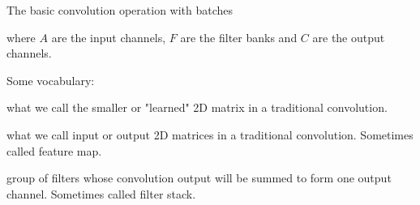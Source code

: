 \documentclass[utf8x,hyperref={pdfpagelabels=false}]{beamer}
\newcommand{\term}[1]{\textcolor{termblue}{#1}}
\begin{document}
\begin{frame}
The basic convolution operation with batches
\begin{overlayarea}{\textwidth}{5.6cm}
\end{overlayarea}
where $A$ are the input channels, $F$ are the filter banks and $C$ are the output channels.
\end{frame}

\begin{frame}
Some vocabulary:
\begin{description}
\item[filter] what we call the smaller or "learned" 2D matrix in a traditional convolution.
\item[channel] what we call input or output 2D matrices in a traditional convolution.  Sometimes called \term{feature map}.
\item[filter bank] group of filters whose convolution output will be summed to form one output channel.  Sometimes called \term{filter stack}.
\end{description}
\end{frame}
\end{document}
